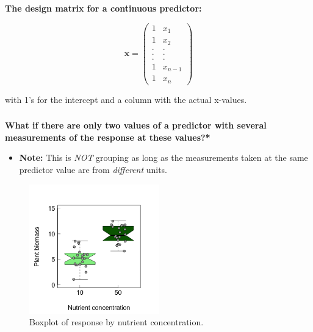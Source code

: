 \documentclass{beamer}
\begin{document}
\begin{frame}
  \frametitle{}
  \textbf{The design matrix for a continuous predictor:}

  \begin{equation*}
  \mathbf{x} = \left( \begin{array}{cc} 1 & x_{1} \\ 1 & x_{2} \\ . & . \\ . & . \\ . & . \\ 1 & x_{n-1} \\ 1 & x_n \end{array}\right)
  \end{equation*}

  with 1's for the intercept and a column with the actual x-values.
\end{frame}

\begin{frame}
  \frametitle{}
  \textbf{What if there are only two values of a predictor with several measurements of the response at these values?*}

  \begin{itemize}
    \item \textbf{Note:} This is \textit{NOT} grouping as long as the measurements taken at the same predictor value are from \textit{different} units.
  \end{itemize}
  
  \begin{figure}[h]
    \centering
    \includegraphics[width=0.5\textwidth]{lectures/day_3_LM_refresh_II/figures/unnamed-chunk-8-1.png} 
    \caption{Boxplot of response by nutrient concentration.}
  \end{figure}
\end{frame}
\end{document}
